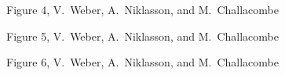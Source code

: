 \documentclass[prl,twocolumn,showpacs,twocolumngrid,superbib]{revtex4}
\begin{document}
{\clearpage

\begin{center}
Figure 4, V.~Weber, A.~Niklasson,  and M.~Challacombe \\[1.cm]
\end{center}

\clearpage

\begin{center}
Figure 5, V.~Weber, A.~Niklasson,  and M.~Challacombe \\[1.cm]
\end{center}

\clearpage

\begin{center}
Figure 6, V.~Weber, A.~Niklasson,  and M.~Challacombe \\[1.cm]
\end{center}

}
\end{document}
